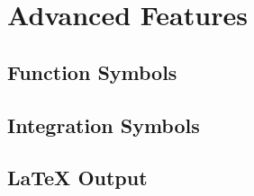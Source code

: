 
\chapter{Advanced Features}

  \section{Function Symbols}

  \section{Integration Symbols}

  \section{\LaTeX{} Output}


